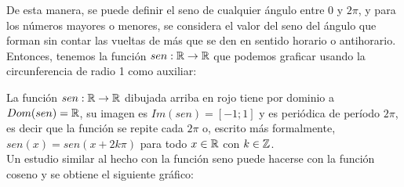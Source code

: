 \documentclass[../Teoría.root.tex]{subfiles}
\begin{document}
De esta manera, se puede definir el seno de cualquier ángulo entre 0 y \(2\pi\), y para los números mayores o menores, se considera el valor del seno del ángulo que forman sin contar las vueltas de más que se den en sentido horario o antihorario.
Entonces, tenemos la función \(sen : \mathbb{R} \rightarrow \mathbb{R}\) que podemos graficar usando la circunferencia de radio 1 como auxiliar:
\begin{center}
    \begin{scaletikzpicturetowidth}{\linewidth}
    \end{scaletikzpicturetowidth}
\end{center}
La función \(sen: \mathbb{R}\rightarrow\mathbb{R}\) dibujada arriba en rojo tiene por dominio a \(Dom(sen) = \mathbb{R}\), su imagen es \(Im(sen) = [−1; 1]\) y es periódica de período \(2\pi\), es decir que la función se repite cada \(2\pi\) o, escrito más formalmente, \(sen(x) = sen(x + 2k\pi)\) para todo \(x \in \mathbb{R}\) con \(k \in \mathbb{Z}\).\\
Un estudio similar al hecho con la función seno puede hacerse con la función coseno y se obtiene el siguiente gráfico:
\begin{center}
\end{center}
\end{document}
